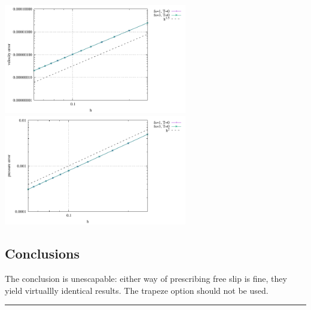 \begin{center}
\includegraphics[width=8cm]{python_codes/fieldstone_151/results/test6/errv}
\includegraphics[width=8cm]{python_codes/fieldstone_151/results/test6/errp}
\end{center}





\subsection*{Conclusions}

The conclusion is unescapable: either way of prescribing free slip is fine, they yield 
virtuallly identical results. The trapeze option should not be used.  


\par\noindent\rule{\textwidth}{0.4pt}

\vspace{.5cm}

\begin{center}
\end{center}

